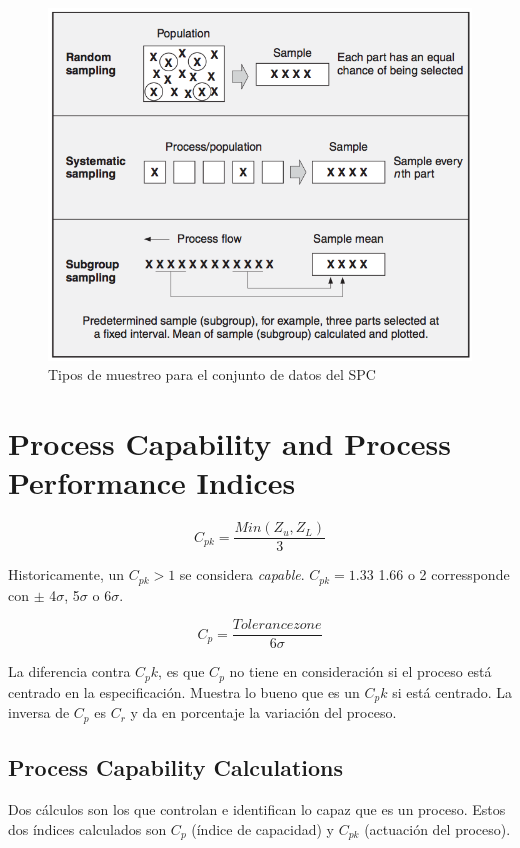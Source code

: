 \documentclass[oneside]{book}
\begin{document}
\begin{figure}[H]
	\centering
	\includegraphics[width=120mm]{imagenes/SamplingSPC.png}
	\caption{Tipos de muestreo para el conjunto de datos del SPC}
	\label{fig:SamplingSPC}
\end{figure}


\section{Process Capability and Process Performance Indices}

\begin{equation}
C_{pk} = \frac{Min(Z_u,Z_L)}{3}
\end{equation}

Historicamente, un $C_{pk} > 1$ se considera \textit{capable}. $C_{pk} = 1.33$ 1.66 o 2 corressponde con $\pm$ 4$\sigma$, 5$\sigma$ o 6$\sigma$.

\begin{equation}
C_p = \frac{Tolerance zone}{6\sigma}
\end{equation}

La diferencia contra $C_pk$, es que $C_p$ no tiene en consideración si el proceso está centrado en la especificación. Muestra lo bueno que es un $C_pk$ si está centrado. La inversa de $C_p$ es $C_r$ y da en porcentaje la variación del proceso.

\subsection{Process Capability Calculations}

Dos cálculos son los que controlan e identifican lo capaz que es un proceso. Estos dos índices calculados son $C_p$ (índice de capacidad) y $C_{pk}$ (actuación del proceso).
\end{document}
